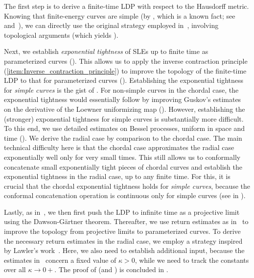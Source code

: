 \documentclass[a4paper, 11pt]{article}
\theoremstyle{definition}
\numberwithin{equation}{section}
\numberwithin{figure}{section}
\begin{document}
The first step is to derive a finite-time LDP with respect to the Hausdorff metric.
Knowing that finite-energy curves are simple 
(by , which is a known fact; 
see~\cite{Friz-Shekhar:Finite_energy_drivers, Wang:Energy_of_deterministic_Loewner_chain} and~\cite[Theorem~3.9]{AHP:Large_deviations_of_DBM_and_multiradial_SLE}), 
we can directly use the original strategy employed 
in~\cite[Proposition~5.3]{Peltola-Wang:LDP}, 
involving topological arguments (which yields ).

Next, we establish \emph{exponential tightness} of SLEs up to finite time as parameterized curves (). 
This allows us to apply the inverse contraction principle (\ref{item:Inverse_contraction_principle}) 
to improve the topology of the finite-time LDP 
to that for parameterized curves (). 
Establishing the exponential tightness for \emph{simple curves} is the gist of .
For non-simple curves in the chordal case, 
the exponential tightness would essentially follow
by improving Guskov's estimates~\cite{Guskov:LPD_for_SLE_in_the_uniform_topology} 
on the derivative of the Loewner uniformizing map ().
However, establishing the (stronger) exponential tightness for simple curves is substantially more difficult. 
To this end, we use detailed estimates on Bessel processes, uniform in space and time (). 
We derive the radial case by comparison to the chordal case. The main technical difficulty here is that 
the chordal case approximates the radial case exponentially well only for very small times. 
This still allows us to conformally concatenate small exponentially tight pieces of chordal curves 
and establish the exponential tightness in the radial case, up to any finite time. 
For this, it is crucial that the chordal exponential tightness holds for \emph{simple curves}, 
because the conformal concatenation operation is continuous only for simple curves (see  in ).



Lastly, as in~\cite{Guskov:LPD_for_SLE_in_the_uniform_topology}, 
we then first push the LDP to infinite time as a projective limit using the Dawson-G\"artner theorem.
Thereafter, we use return estimates as in~\cite{Peltola-Wang:LDP} 
to improve the topology from projective limits to parameterized curves. 
To derive the necessary return estimates in the radial case, we employ a strategy 
inspired by Lawler's work~\cite{Lawler:Continuity_of_radial_and_two-sided_radial_SLE_at_the_terminal_point, 
Field-Lawler:Escape_probability_and_transience_for_SLE}. 
Here, we also need to establish additional input, because the estimates 
in~\cite{Lawler:Continuity_of_radial_and_two-sided_radial_SLE_at_the_terminal_point, 
Field-Lawler:Escape_probability_and_transience_for_SLE} concern a fixed value of $\kappa > 0$,
while we need to track the constants over all $\kappa \to 0+$.
The proof of  (and ) is concluded in . 
\end{document}

